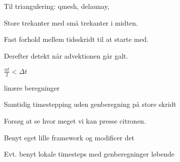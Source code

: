 \documentclass[11pt,a4paper]{article}
\title{}
\author{Malte Stær Nissen}
\begin{document}
\maketitle

Til triangulering:
qmesh,
delaunay,

Store trekanter med små trekanter i midten.

Fast forhold mellem tidsskridt til at starte med.

Derefter detekt når advektionen går galt.

$\frac{\alpha t}{2} < \Delta t$

linære beregninger

Samtidig timestepping uden genberegning på store skridt

Forsøg at se hvor meget vi kan presse citronen.

Benyt eget lille framework og modificer det


Evt. benyt lokale timesteps med genberegninger løbende
\end{document}
